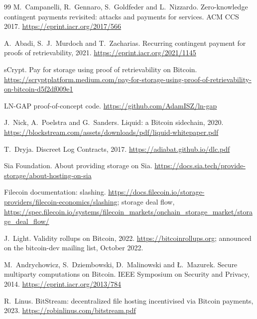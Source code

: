 \documentclass[11pt]{article}
\begin{document}
\begin{thebibliography}{99}
 M.~Campanelli, R.~Gennaro, S.~Goldfeder and L.~Nizzardo. Zero-knowledge contingent payments revisited: attacks and payments for services. ACM CCS 2017. \url{https://eprint.iacr.org/2017/566}

 A.~Abadi, S.~J.~Murdoch and T.~Zacharias. Recurring contingent payment for proofs of retrievability, 2021. \url{https://eprint.iacr.org/2021/1145}

 sCrypt. Pay for storage using proof of retrievability on Bitcoin. \url{https://scryptplatform.medium.com/pay-for-storage-using-proof-of-retrievability-on-bitcoin-d5f2df009e1}

 LN-GAP proof-of-concept code. \url{https://github.com/AdamISZ/ln-gap}

 J.~Nick, A.~Poelstra and G.~Sanders. Liquid: a Bitcoin sidechain, 2020. \url{https://blockstream.com/assets/downloads/pdf/liquid-whitepaper.pdf}

 T.~Dryja. Discreet Log Contracts, 2017. \url{https://adiabat.github.io/dlc.pdf}

 Sia Foundation. About providing storage on Sia. \url{https://docs.sia.tech/provide-storage/about-hosting-on-sia}

 Filecoin documentation: slashing. \url{https://docs.filecoin.io/storage-providers/filecoin-economics/slashing}; storage deal flow, \url{https://spec.filecoin.io/systems/filecoin_markets/onchain_storage_market/storage_deal_flow/}

 J.~Light. Validity rollups on Bitcoin, 2022. \url{https://bitcoinrollups.org}; announced on the bitcoin-dev mailing list, October 2022.

 M.~Andrychowicz, S.~Dziembowski, D.~Malinowski and {\L}.~Mazurek. Secure multiparty computations on Bitcoin. IEEE Symposium on Security and Privacy, 2014. \url{https://eprint.iacr.org/2013/784}

 R.~Linus. BitStream: decentralized file hosting incentivised via Bitcoin payments, 2023. \url{https://robinlinus.com/bitstream.pdf}

\end{thebibliography}
\end{document}
